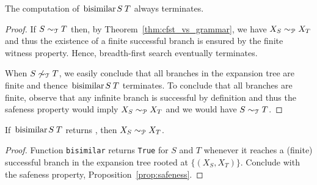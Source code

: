 \begin{lemma}[Termination]
\label{lem:termination}
	The computation of $\bisimf S T$ always terminates.
\end{lemma}
%
\begin{proof}
	If $S\sim_\mathcal T T$ then, by Theorem~\ref{thm:cfst_vs_grammar},
	we have $X_S\sim_\mathcal P X_T$ and thus the existence of a finite
	successful branch is ensured by the finite witness property. 
	Hence, breadth-first search eventually terminates. 
	
	When $S\not\sim_\mathcal T T$, we easily conclude that all branches
        in the expansion tree are finite and thence $\bisimf S T$
        terminates.  To conclude that all branches are finite, observe
        that any infinite branch is successful by definition and thus
        the safeness property would imply $X_S\sim_\mathcal P X_T$ and we
        would have $S\sim_\mathcal T T$.
\end{proof}


\begin{lemma}
  \label{lem:bisimilar-to-prod}
  If $\bisimf S T$ returns , then
  $X_{S} \sim_\mathcal P X_{T}$.
\end{lemma}

\begin{proof}
  Function \lstinline|bisimilar| returns \lstinline|True| for $S$ and
  $T$ whenever it reaches a (finite) successful branch in the expansion
  tree rooted at $\{(X_{S}, X_{T})\}$. Conclude with the safeness property,
  Proposition~\ref{prop:safeness}.
\end{proof}

